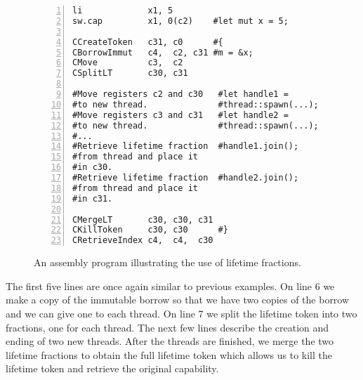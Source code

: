 \begin{figure}[h]
\begin{lstlisting}[style=custASM, numbers = left ,xleftmargin=1.5em]
li             x1, 5
sw.cap         x1, 0(c2)    #let mut x = 5;

CCreateToken   c31, c0      #{
CBorrowImmut   c4,  c2, c31 #m = &x;
CMove          c3,  c2
CSplitLT       c30, c31

#Move registers c2 and c30   #let handle1 =
#to new thread.              #thread::spawn(...);
#Move registers c3 and c31   #let handle2 =
#to new thread.              #thread::spawn(...);
#...
#Retrieve lifetime fraction  #handle1.join();
#from thread and place it
#in c30.
#Retrieve lifetime fraction  #handle2.join();
#from thread and place it
#in c31.

CMergeLT       c30, c30, c31
CKillToken     c30, c30      #}
CRetrieveIndex c4,  c4,  c30
\end{lstlisting}
\caption{An assembly program illustrating the use of lifetime fractions.}
\label{fig:asmthreadexample}
\end{figure}

The first five lines are once again similar to previous examples.
On line 6 we make a copy of the immutable borrow so that we have two copies of the borrow and we can give one to each thread.
On line 7 we split the lifetime token into two fractions, one for each thread.
The next few lines describe the creation and ending of two new threads.
After the threads are finished, we merge the two lifetime fractions to obtain the full lifetime token which allows us to kill the lifetime token and retrieve the original capability.

